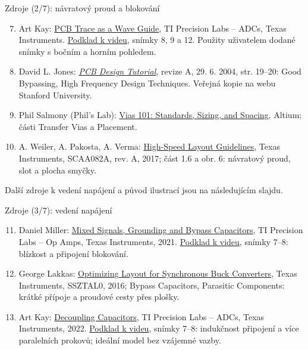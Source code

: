 \documentclass{beamer}
\begin{document}
\begin{frame}[t]{Zdroje (2/7): návratový proud a blokování}
	\footnotesize
	\begin{enumerate}
		\setcounter{enumi}{6}
		\item Art Kay: \href{https://www.ti.com/video/6307562268112}{PCB Trace as a Wave Guide}, TI Precision Labs -- ADCs, Texas Instruments. \href{https://www.ti.com/content/dam/videos/external-videos/zh-tw/9/3816841626001/6307562268112.mp4/subassets/pcb-trace-as-wave-guide-presentation-quiz.pdf}{Podklad k videu}, snímky 8, 9 a 12. Použity uživatelem dodané snímky s bočním a horním pohledem.
		\item David L. Jones: \href{https://www.scs.stanford.edu/~zyedidia/docs/pcb/pcb_tutorial.pdf}{\textit{PCB Design Tutorial}}, revize A, 29. 6. 2004, str. 19--20: Good Bypassing, High Frequency Design Techniques. Veřejná kopie na webu Stanford University.
		\item Phil Salmony (Phil's Lab): \href{https://resources.altium.com/p/vias-101}{Vias 101: Standards, Sizing, and Spacing}, Altium; části Transfer Vias a Placement.
		\item A. Weiler, A. Pakosta, A. Verma: \href{https://www.ti.com/lit/pdf/SCAA082A}{High-Speed Layout Guidelines}, Texas Instruments, SCAA082A, rev. A, 2017; část 1.6 a obr. 6: návratový proud, slot a plocha smyčky.
	\end{enumerate}
	\vfill
	{\scriptsize Další zdroje k vedení napájení a původ ilustrací jsou na následujícím slajdu.}
\end{frame}

\begin{frame}[t]{Zdroje (3/7): vedení napájení}
	\footnotesize
	\begin{enumerate}
		\setcounter{enumi}{10}
		\item Daniel Miller: \href{https://www.ti.com/video/6245227303001}{Mixed Signals, Grounding and Bypass Capacitors}, TI Precision Labs -- Op Amps, Texas Instruments, 2021. \href{https://www.ti.com/content/dam/videos/external-videos/en-us/8/3816841626001/6245227303001.mp4/subassets/op_amp_pcb_layout_mixed_signals_grounding_and_bypass_capacitors.pdf}{Podklad k videu}, snímky 7--8: blízkost a připojení blokování.
		\item George Lakkas: \href{https://www.ti.com/document-viewer/lit/html/SSZTAL0/GUID-CF03725F-911C-4A96-9391-0E639F290409}{Optimizing Layout for Synchronous Buck Converters}, Texas Instruments, SSZTAL0, 2016; Bypass Capacitors, Parasitic Components: krátké přípoje a proudové cesty přes plošky.
		\item Art Kay: \href{https://www.ti.com/video/6313253251112}{Decoupling Capacitors}, TI Precision Labs -- ADCs, Texas Instruments, 2022. \href{https://www.ti.com/content/dam/videos/external-videos/en-us/9/3816841626001/6313253251112.mp4/subassets/notes-decoupling_capacitors.pdf}{Podklad k videu}, snímky 7--8: indukčnost připojení a více paralelních prokovů; ideální model bez vzájemné vazby.
	\end{enumerate}
\end{frame}
\end{document}
